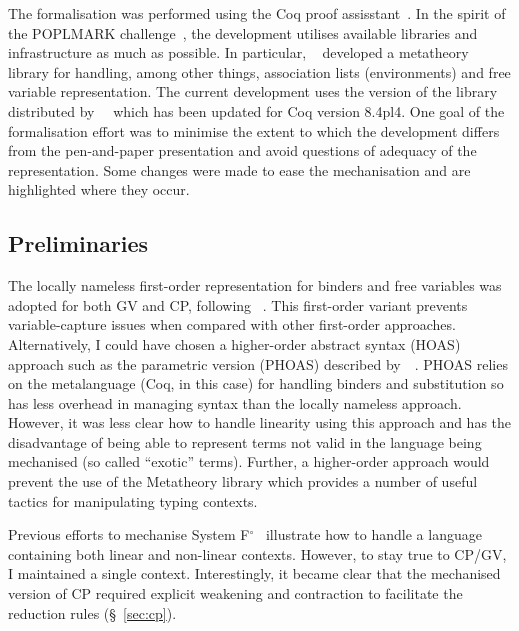 \documentclass{mpaper}
\newcommand{\fpop}{System F${}^\circ$\xspace}
\begin{document}
The formalisation was performed using the Coq proof
assisstant~\cite{Coq:manual}. In the spirit of the POPLMARK
challenge~\cite{Aydemir:2005:MMM}, the development utilises available
libraries and infrastructure as much as possible. In particular,
\citeauthor{Aydemir:2008:EFM}~\cite{Aydemir:2008:EFM} developed a metatheory
library for handling, among other things, association lists (environments) and
free variable representation. The current development uses the version of the
library distributed by~\citeauthor{Park:2014:MMW}~\cite{Park:2014:MMW} which
has been updated for Coq version 8.4pl4. One goal of the formalisation effort
was to minimise the extent to which the development differs from the
pen-and-paper presentation and avoid questions of adequacy of the
representation. Some changes were made to ease the mechanisation and are
highlighted where they occur.

\subsection{Preliminaries}\label{sec:approach}

The locally nameless first-order representation for binders and free variables
was adopted for both GV and CP, following
\citeauthor{Aydemir:2008:EFM}~\cite{Aydemir:2008:EFM}. This first-order
variant prevents variable-capture issues when compared with other first-order
approaches. Alternatively, I could have chosen a higher-order abstract syntax
(HOAS) approach such as the parametric version (PHOAS) described
by~\citeauthor{Chlipala:2008:PHOAS}~\cite{Chlipala:2008:PHOAS}. PHOAS relies
on the metalanguage (Coq, in this case) for handling binders and substitution
so has less overhead in managing syntax than the locally nameless
approach. However, it was less clear how to handle linearity using this
approach and has the disadvantage of being able to represent terms not valid
in the language being mechanised (so called ``exotic'' terms). Further, a
higher-order approach would prevent the use of the Metatheory library which
provides a number of useful tactics for manipulating typing contexts.

Previous efforts to mechanise \fpop~\cite{Park:2014:MMW} illustrate how to
handle a language containing both linear and non-linear contexts. However, to
stay true to CP/GV, I maintained a single context. Interestingly, it became
clear that the mechanised version of CP required explicit weakening and
contraction to facilitate the reduction rules (\S~\ref{sec:cp}).
\end{document}
